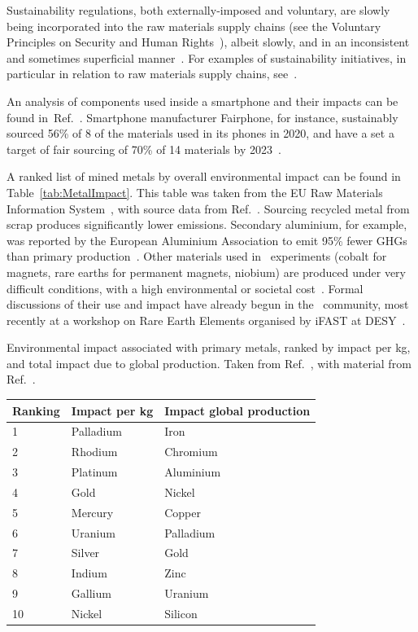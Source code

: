 \documentclass[../SustainableHEP.tex]{subfiles}
\begin{document}
Sustainability regulations, both externally-imposed and voluntary, are slowly being incorporated into the raw materials supply chains (see \eg the Voluntary Principles on Security and Human Rights~\cite{VoluntaryPrinciples}), albeit slowly, and in an inconsistent and sometimes superficial manner~\cite{ResponsibleMiningIndex,ResponsibleMiningFoundation}.  For examples of sustainability initiatives, in particular in relation to raw materials supply chains, see~.

An analysis of components used inside a smartphone and their impacts can be found in~Ref.~\cite{fairphone}.  Smartphone manufacturer Fairphone, for instance, sustainably sourced 56\% of 8 of the materials used in its phones in 2020, and have a set a target of fair sourcing of 70\% of 14 materials by 2023~\cite{fairphone2}. 

A ranked list of mined metals by overall environmental impact can be found in Table~\ref{tab:MetalImpact}.  This table was taken from the EU Raw Materials Information System~\cite{EURMIS}, with source data from Ref.~\cite{UNEP2010}.  Sourcing recycled metal from scrap produces significantly lower emissions.  Secondary aluminium, for example, was reported by the European Aluminium Association to emit 95\% fewer GHGs than primary production~\cite{EURaw}. Other materials used in \ACR\ experiments (\eg cobalt for magnets, rare earths for permanent magnets, niobium) are produced under very difficult conditions, with a high environmental or societal cost~\cite{FARJANA2019150, EURare, ALVES2019275}.  Formal discussions of their use and impact have already begun in the \ACR\ community, most recently at a workshop on Rare Earth Elements organised by iFAST at DESY~\cite{DESYRareEarth}.

{\centering
{}
\captionsetup{type=table}
\caption[Environmental impact associated with primary metals]{Environmental impact associated with primary metals, ranked by impact per kg, and total impact due to global production.  Taken from Ref.~\cite{EURMIS}, with material from Ref.~\cite{UNEP2010}.}
\label{tab:MetalImpact}
\begin{tabular}{@{}lll@{}}\toprule
Ranking& Impact per kg & 
Impact global production \\ 
\midrule
1 & Palladium & Iron \\
2 & Rhodium & Chromium \\
3 & Platinum & Aluminium \\
4 & Gold & Nickel \\
5 & Mercury & Copper \\
6 & Uranium & Palladium \\
7 & Silver & Gold \\
8& Indium & Zinc \\
9 & Gallium & Uranium \\
10 & Nickel & Silicon \\

\bottomrule
\end{tabular}}
\end{document}
